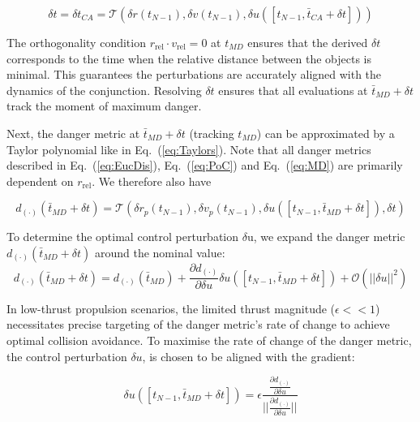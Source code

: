 \documentclass[letterpaper, preprint, paper,11pt]{AAS}	%
\renewcommand{\eqref}[1]{Eq.~(\ref{#1})}
\begin{document}
\begin{equation}\label{eq:ResolvingDeltaT}
	\delta t = \delta t_{CA} = \mathcal{T}(\delta r(t_{N-1}), \delta v(t_{N-1}), \delta u([t_{N-1}, \bar{t}_{CA} + \delta t]))
\end{equation}

The orthogonality condition $r_{\text{rel}}\cdot v_{\text{rel}} =0$ at $t_{MD}$ ensures that the derived $\delta t$ corresponds to the time when the relative distance between the objects is minimal. This guarantees the perturbations are accurately aligned with the dynamics of the conjunction. Resolving $\delta t$ ensures that all evaluations at $\bar{t}_{MD} + \delta t$ track the moment of maximum danger.

Next, the danger metric at $\bar{t}_{MD} + \delta t$ (tracking $t_{MD}$) can be approximated by a Taylor polynomial like in \eqref{eq:Taylors}. Note that all danger metrics described in \eqref{eq:EucDis}, \eqref{eq:PoC} and \eqref{eq:MD} are primarily dependent on $r_{\text{rel}}$. We therefore also have 

\begin{equation}\label{eq:DMTaylor}
		d_{(\cdot)}(\bar{t}_{MD}+ \delta t) = \mathcal{T}(\delta r_p(t_{N-1}), \delta v_p(t_{N-1}), \delta u([t_{N-1}, \bar{t}_{MD} + \delta t]), \delta t)
\end{equation}

To determine the optimal control perturbation $\delta$u, we expand the danger metric $d_{(\cdot)}(\bar{t}_{MD} + \delta t)$ around the nominal value:
\begin{equation}\label{eq:DMExpansion}
	d_{(\cdot)}(\bar{t}_{MD} + \delta t) = d_{(\cdot)}(\bar{t}_{MD}) + \frac{\partial d_{(\cdot)}}{\partial \delta u} \delta u([t_{N-1},  \bar{t}_{MD} + \delta t]) + \mathcal{O}(||\delta u||^2)
\end{equation}

In low-thrust propulsion scenarios, the limited thrust magnitude ($\epsilon << 1$) necessitates precise targeting of the danger metric's rate of change to achieve optimal collision avoidance. To maximise the rate of change of the danger metric, the control perturbation  $\delta u$,  is chosen to be aligned with the gradient:

\begin{equation}\label{eq:Control}
	\delta u([t_{N-1}, \bar{t}_{MD} + \delta t]) = \epsilon \frac{ \frac{\partial d_{(\cdot)}}{\partial \delta u}}{|| \frac{\partial d_{(\cdot)}}{\partial \delta u}||}
\end{equation}
\end{document}
